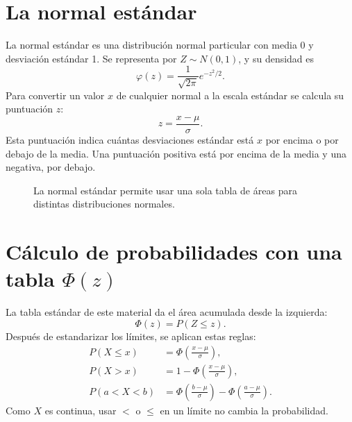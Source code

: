 \documentclass[11pt]{article}
\begin{document}
\section{La normal estándar}

La normal estándar es una distribución normal particular con media 0 y desviación estándar 1. Se representa por $Z\sim N(0,1)$, y su densidad es
\[
\varphi(z)=\frac{1}{\sqrt{2\pi}}e^{-z^2/2}.
\]
Para convertir un valor $x$ de cualquier normal a la escala estándar se calcula su puntuación $z$:
\[
z=\frac{x-\mu}{\sigma}.
\]
Esta puntuación indica cuántas desviaciones estándar está $x$ por encima o por debajo de la media. Una puntuación positiva está por encima de la media y una negativa, por debajo.

\begin{figure}[htbp]
\centering
{}
\caption{La normal estándar permite usar una sola tabla de áreas para distintas distribuciones normales.}
\label{fig:normal-estandar}
\end{figure}

\section{Cálculo de probabilidades con una tabla $\Phi(z)$}

La tabla estándar de este material da el área acumulada desde la izquierda:
\[
\Phi(z)=P(Z\le z).
\]
Después de estandarizar los límites, se aplican estas reglas:
\begin{align*}
P(X\le x)&=\Phi\!\left(\frac{x-\mu}{\sigma}\right),\\
P(X>x)&=1-\Phi\!\left(\frac{x-\mu}{\sigma}\right),\\
P(a<X<b)&=\Phi\!\left(\frac{b-\mu}{\sigma}\right)-\Phi\!\left(\frac{a-\mu}{\sigma}\right).
\end{align*}
Como $X$ es continua, usar $<$ o $\le$ en un límite no cambia la probabilidad.
\end{document}
